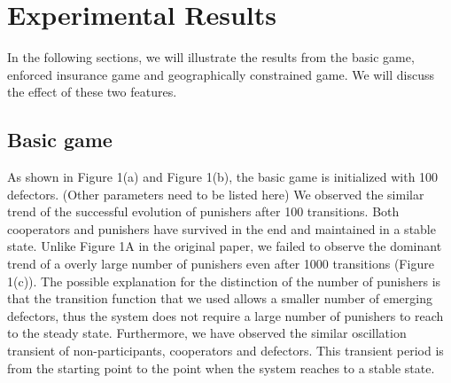 \documentclass[11pt]{article}
\begin{document}
\section{Experimental Results}
In the following sections, we will illustrate the results from the basic game, enforced insurance game and geographically constrained game. We will discuss the effect of these two features.
\subsection{Basic game}
As shown in Figure 1(a) and Figure 1(b), the basic game is initialized with 100 defectors. (Other parameters need to be listed here) We observed the similar trend of the successful evolution of punishers after 100 transitions. Both cooperators and punishers have survived in the end and maintained in a stable state. Unlike Figure 1A in the original paper, we failed to observe the dominant trend of a overly large number of punishers even after 1000 transitions (Figure 1(c)). The possible explanation for the distinction of the number of punishers is that the transition function that we used allows a smaller number of emerging defectors, thus the system does not require a large number of punishers to reach to the steady state. Furthermore, we have observed the similar oscillation transient of non-participants, cooperators and defectors. This transient period is from the starting point to the point when the system reaches to a stable state.
\end{document}
